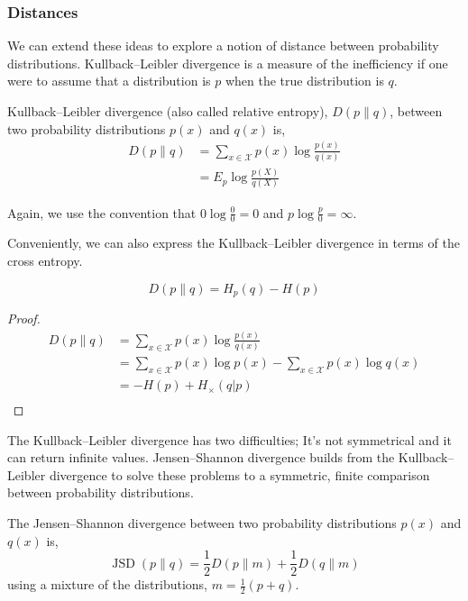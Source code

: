 

\subsubsection{Distances}
We can extend these ideas to explore a notion of distance between probability distributions. Kullback–Leibler divergence is a measure of the inefficiency if one were to assume that a distribution is $p$ when the true distribution is $q$.

\begin{definition}
	Kullback–Leibler divergence (also called relative entropy), $D(p \|q)$,  between two probability distributions $p(x)$ and $q(x)$ is,
	\begin{align} 
		D(p \| q) &=\sum_{x \in \mathcal{X}} p(x) \log \frac{p(x)}{q(x)} \\ 
					 &=E_{p} \log \frac{p(X)}{q(X)} 
	\end{align}
\end{definition}

Again, we use the convention that  $0 \log \frac{0}{0} = 0 $ and $p \log \frac{p}{0} = \infty $. 


Conveniently, we can also express the Kullback–Leibler divergence in terms of the cross entropy.
\begin{lemma}
		\begin{equation}
		D(p \| q) = H_p(q) - H(p) 
		\end{equation}
\end{lemma}
\begin{proof}
	\begin{align}
		D(p \| q) &=\sum_{x \in \mathcal{X}} p(x) \log \frac{p(x)}{q(x)} \\
		 &= \sum_{x \in \mathcal{X}} p(x) \log p(x)    -     \sum_{x \in \mathcal{X}} p(x) \log q(x)\\
		 &= -H(p)   +    H_{\times} (q|p)\\
	\end{align}
\end{proof}

The Kullback–Leibler divergence has two difficulties; It's not symmetrical and it can return infinite values. Jensen–Shannon divergence builds from the Kullback–Leibler divergence to solve these problems to a symmetric, finite comparison between probability distributions. 


\begin{definition}
 The Jensen–Shannon divergence between two probability distributions $p(x)$ and $q(x)$ is,
	\begin{equation}
	\operatorname{JSD}(p \| q)=\frac{1}{2} D(p \| m)+\frac{1}{2} D(q \| m)
	\end{equation}
	using a mixture of the distributions, 	$m=\frac{1}{2}(p+q)$.
\end{definition}

